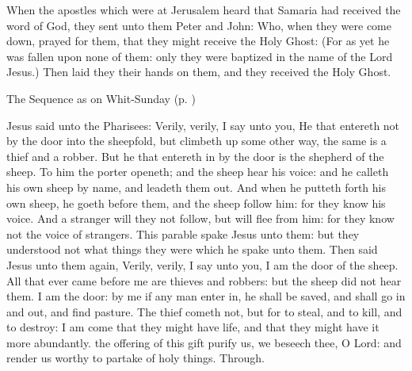 \vspace{-1ex}

 When the apostles which were at Jerusalem heard that Samaria had received the word of God, they sent unto them Peter and John: Who, when they were come down, prayed for them, that they might receive the Holy Ghost: (For as yet he was fallen upon none of them: only they were baptized in the name of the Lord Jesus.) Then laid they their hands on them, and they received the Holy Ghost.
\begin{rubric}
{The Sequence as on Whit-Sunday (p. \pageref{WhitSeq})}
\end{rubric}

\vspace{-0.5ex}

 Jesus said unto the Pharisees: Verily, verily, I say unto you, He that entereth not by the door into the sheepfold, but climbeth up some other way, the same is a thief and a robber. But he that entereth in by the door is the shepherd of the sheep. To him the porter openeth; and the sheep hear his voice: and he calleth his own sheep by name, and leadeth them out. And when he putteth forth his own sheep, he goeth before them, and the sheep follow him: for they know his voice. And a stranger will they not follow, but will flee from him: for they know not the voice of strangers. This parable spake Jesus unto them: but they understood not what things they were which he spake unto them. Then said Jesus unto them again, Verily, verily, I say unto you, I am the door of the sheep. All that ever came before me are thieves and robbers: but the sheep did not hear them. I am the door: by me if any man enter in, he shall be saved, and shall go in and out, and find pasture. The thief cometh not, but for to steal, and to kill, and to destroy: I am come that they might have life, and that they might have it more abundantly.
\secret
{} the offering of this gift purify us, we beseech thee, O Lord: and render us worthy to partake of holy things. Through.\\

